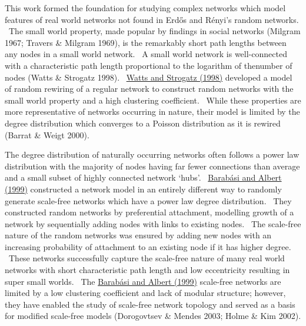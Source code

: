 This work formed the foundation for studying complex networks which model features of real world networks not found in Erd\H{o}s and R\'enyi{\textquoteright}s random networks. \ The small world property, made popular by findings in social networks (Milgram 1967; Travers \& Milgram 1969), is the remarkably short path lengths between any nodes in a small world network. \ A small world network is well-connected with a characteristic path length proportional to the logarithm of thenumber of nodes (Watts \& Strogatz 1998). \ \hyperlink{ENREF112}{Watts and Strogatz (1998)} developed a model of random rewiring of a regular network to construct random networks with the small world property and a high clustering coefficient. \ While these properties are more representative of networks occurring in nature, their model is limited by the degree distribution which converges to a Poisson distribution as it is rewired (Barrat \& Weigt 2000). \ 


The degree distribution of naturally occurring networks often follows a power law distribution with the majority of nodes having far fewer connections than average and a small subset of highly connected network {\textquoteleft}hubs{\textquoteright}. \ \hyperlink{ENREF7}{Barab\'asi and Albert (1999)} constructed a network model in an entirely different way to randomly generate scale-free networks which have a power law degree distribution. \ They constructed random networks by preferential attachment, modelling growth of a network by sequentially adding nodes with links to existing nodes. \ The scale-free nature of the random networks was ensured by adding new nodes with an increasing probability of attachment to an existing node if it has higher degree. \ These networks successfully capture the scale-free nature of many real world networks with short characteristic path length and low eccentricity resulting in super small worlds. \ The \hyperlink{ENREF7}{Barab\'asi and Albert (1999)} scale-free networks are limited by a low clustering coefficient and lack of modular structure; however, they have enabled the study of scale-free network topology and served as a basis for modified scale-free models (Dorogovtsev \& Mendes 2003; Holme \& Kim 2002). \ 


